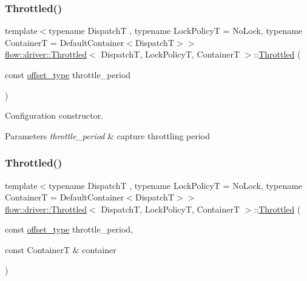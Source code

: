 \subsubsection{\texorpdfstring{Throttled()}{Throttled()}\hspace{0.1cm}{\footnotesize\ttfamily [1/2]}}
{\footnotesize\ttfamily template$<$typename DispatchT , typename Lock\+PolicyT  = No\+Lock, typename ContainerT  = Default\+Container$<$\+Dispatch\+T$>$$>$ \\
\hyperlink{classflow_1_1driver_1_1_throttled}{flow\+::driver\+::\+Throttled}$<$ DispatchT, Lock\+PolicyT, ContainerT $>$\+::\hyperlink{classflow_1_1driver_1_1_throttled}{Throttled} (\begin{DoxyParamCaption}\item[{const \hyperlink{classflow_1_1driver_1_1_throttled_a66bc6f61441318d9a42de85e3f24e37d}{offset\+\_\+type}}]{throttle\+\_\+period }\end{DoxyParamCaption})\hspace{0.3cm}{\ttfamily [explicit]}}



Configuration constructor. 


\begin{DoxyParams}{Parameters}
{\em throttle\+\_\+period} & capture throttling period \\
\hline
\end{DoxyParams}
\mbox{\label{classflow_1_1driver_1_1_throttled_a9f92edf21a6634946d3a0145b569806c}} 
\subsubsection{\texorpdfstring{Throttled()}{Throttled()}\hspace{0.1cm}{\footnotesize\ttfamily [2/2]}}
{\footnotesize\ttfamily template$<$typename DispatchT , typename Lock\+PolicyT  = No\+Lock, typename ContainerT  = Default\+Container$<$\+Dispatch\+T$>$$>$ \\
\hyperlink{classflow_1_1driver_1_1_throttled}{flow\+::driver\+::\+Throttled}$<$ DispatchT, Lock\+PolicyT, ContainerT $>$\+::\hyperlink{classflow_1_1driver_1_1_throttled}{Throttled} (\begin{DoxyParamCaption}\item[{const \hyperlink{classflow_1_1driver_1_1_throttled_a66bc6f61441318d9a42de85e3f24e37d}{offset\+\_\+type}}]{throttle\+\_\+period,  }\item[{const ContainerT \&}]{container }\end{DoxyParamCaption})\hspace{0.3cm}{\ttfamily [explicit]}}



